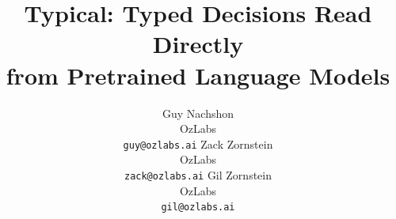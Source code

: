 \documentclass{article}
\title{Typical: Typed Decisions Read Directly\\ from Pretrained Language Models}
\author{%
  Guy Nachshon \\
  OzLabs \\
  \texttt{guy@ozlabs.ai}
  \And
  Zack Zornstein \\
  OzLabs \\
  \texttt{zack@ozlabs.ai}
  \And
  Gil Zornstein \\
  OzLabs \\
  \texttt{gil@ozlabs.ai}
}
\theoremstyle{plain}
\theoremstyle{definition}
\theoremstyle{remark}
\begin{document}
\maketitle

\begin{abstract}

\end{abstract}










{\small
\setlength{\bibsep}{3pt plus 1pt}


}

\newpage
\appendix


\end{document}

